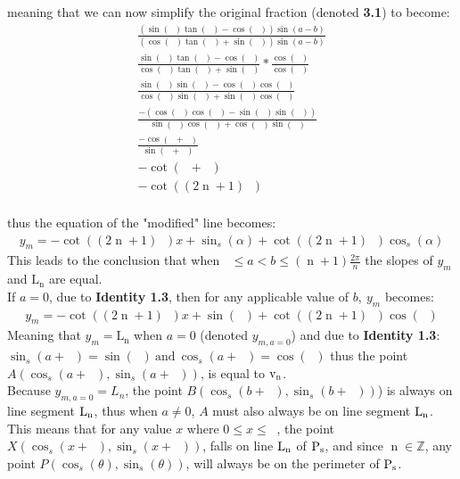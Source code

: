 \documentclass[11pt]{article}
\DeclareMathOperator{\custi}{\mathrm{n}}
\DeclareMathOperator{\period}{\frac{2\pi}{s}}
\DeclareMathOperator{\hp}{\frac{\pi}{s}}
\DeclareMathOperator{\iperiod}{\custi\frac{2\pi}{s}}
\begin{document}
meaning that we can now simplify the original fraction (denoted \textbf{3.1}) to become:
\begin{gather*}
\frac{(\sin(\iperiod)\tan(\hp)-\cos(\iperiod))\sin(a-b)}{(\cos(\iperiod)\tan(\hp)+\sin(\iperiod))\sin(a-b)}\\
\frac{\sin(\iperiod)\tan(\hp)-\cos(\iperiod)}{\cos(\iperiod)\tan(\hp)+\sin(\iperiod)} * \frac{\cos(\hp)}{\cos(\hp)}\\
\frac{\sin(\iperiod)\sin(\hp)-\cos(\iperiod)\cos(\hp)}{\cos(\iperiod)\sin(\hp)+\sin(\iperiod)\cos(\hp)}\\
\frac{-(\cos(\iperiod)\cos(\hp)-\sin(\iperiod)\sin(\hp))}{\sin(\hp)\cos(\iperiod)+\cos(\hp)\sin(\iperiod)}\\
\frac{-\cos(\iperiod+\hp)}{\sin(\iperiod+\hp)}\\
-\cot(\iperiod+\hp)\\
-\cot((2\custi+1)\hp)
\end{gather*}
\fi\\
thus the equation of the "modified" line becomes:
\begin{gather*}
y_m=-\cot((2\custi+1)\hp)x+\sin_s(\alpha)+\cot((2\custi+1)\hp)\cos_s(\alpha)
\end{gather*}
This leads to the conclusion that when \(\iperiod\leq a<b\leq(\custi+1)\frac{2\pi}{n}\) the slopes of \(y_m\) and \(\mathrm{L_n}\) are equal. \\
If \(a=0\), due to \textbf{Identity 1.3}, then for any applicable value of \(b,\ y_m\) becomes:
\begin{gather*}
y_m=-\cot((2\custi+1)\hp)x+\sin(\iperiod)+\cot((2\custi+1)\hp)\cos(\iperiod)
\end{gather*}
Meaning that \(y_m=\mathrm{L_n}\) when \(a=0\) (denoted  \(y_{m,a=0}\)) and due to \textbf{Identity 1.3}: \(\sin_s(a+\iperiod)=\sin(\iperiod) \mathrm{\ and\ } \cos_s(a+\iperiod)=\cos(\iperiod)\) thus the point \(A(\cos_s(a+\iperiod), \sin_s(a+\iperiod))\), is equal to \(\rm v_n\).\\
Because \(y_{m,a=0} = L_n\), the point \(B(\cos_s(b+\iperiod),\sin_s(b+\iperiod))\)) is always on line segment \(\rm L_n\), thus when \(a\neq0\), \(A\) must also always be on line segment \(\rm L_n\).\\
This means that for any value \(x\) where \(0\leq x \leq\period\), the point \(X(\cos_s(x+\iperiod),\sin_s(x+\iperiod))\), falls on line \(\rm L_n\) of \(\rm P_s\), and since \(\custi\in\mathbb{Z}\), any point \(P(\cos_s(\theta),\sin_s(\theta))\), will always be on the perimeter of \(\rm P_s\).
\end{document}
